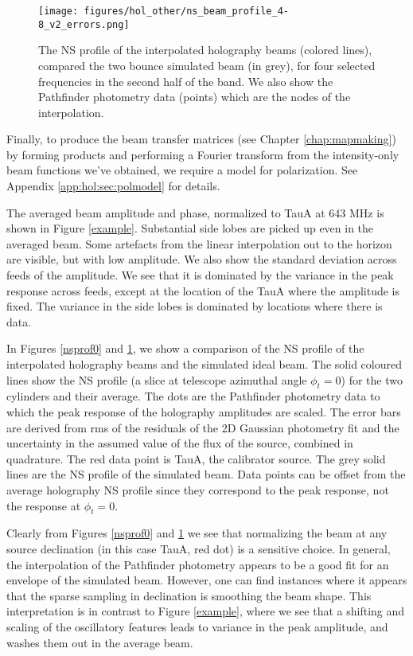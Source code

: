 \begin{figure}[h!]
\begin{center}
\texttt{[image: figures/hol\_other/ns\_beam\_profile\_4-8\_v2\_errors.png]}
\caption{The NS profile of the interpolated holography beams (colored lines), compared the two bounce simulated beam (in grey), for four selected frequencies in the second half of the band. We also show the Pathfinder photometry data (points) which are the nodes of the interpolation. \label{nsprof1}}
\end{center}
\end{figure}

Finally, to produce the beam transfer matrices (see Chapter \ref{chap:mapmaking}) by forming products and performing a Fourier transform from the intensity-only beam functions we've obtained, we require a model for polarization. See Appendix \ref{app:hol:sec:polmodel} for details.

The averaged beam amplitude and phase, normalized to TauA at 643 MHz is shown in Figure \ref{example}. Substantial side lobes are picked up even in the averaged beam. Some artefacts from the linear interpolation out to the horizon are visible, but with low amplitude. We also show the standard deviation across feeds of the amplitude. We see that it is dominated by the variance in the peak response across feeds, except at the location of the TauA where the amplitude is fixed. The variance in the side lobes is dominated by locations where there is data.

In Figures \ref{nsprof0} and \ref{nsprof1}, we show a comparison of the NS profile of the interpolated holography beams and the simulated ideal beam. The solid coloured lines show the NS profile (a slice at telescope azimuthal angle $\phi_t = 0$) for the two cylinders and their average. The dots are the Pathfinder photometry data to which the peak response of the holography amplitudes are scaled. The error bars are derived from rms of the residuals of the 2D Gaussian photometry fit and the uncertainty in the assumed value of the flux of the source, combined in quadrature. The red data point is TauA, the calibrator source. The grey solid lines are the NS profile of the simulated beam. Data points can be offset from the average holography NS profile since they correspond to the peak response, not the response at $\phi_t = 0$.

Clearly from Figures \ref{nsprof0} and \ref{nsprof1} we see that normalizing the beam at any source declination (in this case TauA, red dot) is a sensitive choice. In general, the interpolation of the Pathfinder photometry appears to be a good fit for an envelope of the simulated beam. However, one can find instances where it appears that the sparse sampling in declination is smoothing the beam shape. This interpretation is in contrast to Figure \ref{example}, where we see that a shifting and scaling of the oscillatory features leads to variance in the peak amplitude, and washes them out in the average beam.

